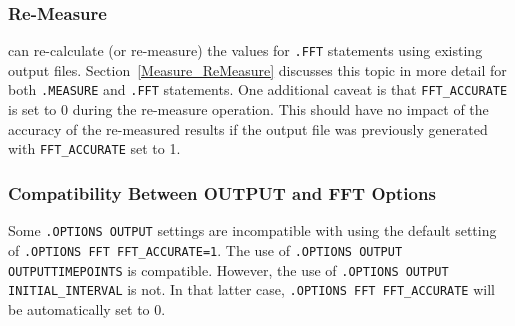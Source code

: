 \subsubsection{Re-Measure}
\label{Measure_FFT_ReMeasure}
\Xyce{} can re-calculate (or re-measure) the values for {\tt .FFT} statements
using existing \Xyce{} output files.  Section~\ref{Measure_ReMeasure} discusses
this topic in more detail for both {\tt .MEASURE} and {\tt .FFT} statements. One
additional caveat is that \texttt{FFT\_ACCURATE} is set to 0 during the re-measure
operation.  This should have no impact of the accuracy of the re-measured results
if the output file was previously generated with \texttt{FFT\_ACCURATE} set to 1.

\subsubsection{Compatibility Between OUTPUT and FFT Options}
Some \texttt{.OPTIONS OUTPUT} settings are incompatible with using the default
setting of \texttt{.OPTIONS FFT FFT\_ACCURATE=1}.  The use of
\texttt{.OPTIONS OUTPUT OUTPUTTIMEPOINTS} is compatible.  However, the use of
\texttt{.OPTIONS OUTPUT INITIAL\_INTERVAL} is not.  In that latter case,
\texttt{.OPTIONS FFT FFT\_ACCURATE} will be automatically set to 0.
